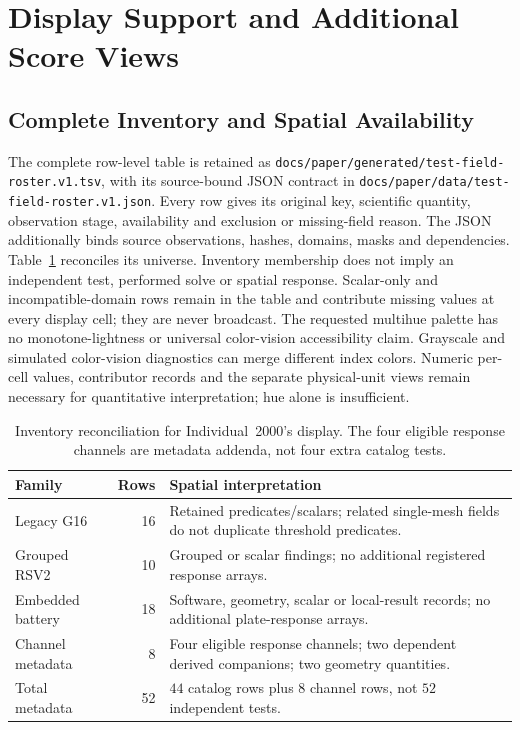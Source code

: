 \section{Display Support and Additional Score Views}
\label{sec:display-score-views}

\subsection{Complete Inventory and Spatial Availability}
The complete row-level table is retained as
\nolinkurl{docs/paper/generated/test-field-roster.v1.tsv}, with its source-bound
JSON contract in \nolinkurl{docs/paper/data/test-field-roster.v1.json}.
Every row gives its original key, scientific quantity, observation stage,
availability and exclusion or missing-field reason. The JSON additionally
binds source observations, hashes, domains, masks and dependencies.
Table~\ref{tab:display-roster-families} reconciles its universe. Inventory
membership does not imply an independent test, performed solve or spatial
response. Scalar-only and incompatible-domain rows remain in the table and
contribute missing values at every display cell; they are never broadcast.
The requested multihue palette has no monotone-lightness or universal
color-vision accessibility claim. Grayscale and simulated color-vision
diagnostics can merge different index colors. Numeric per-cell values,
contributor records and the separate physical-unit views remain necessary
for quantitative interpretation; hue alone is insufficient.

\begin{table}[ht]
\centering
\caption{Inventory reconciliation for Individual~2000's display. The four
eligible response channels are metadata addenda, not four extra catalog tests.}
\label{tab:display-roster-families}
\begin{tabular}{@{}lrp{}@{}}
\toprule
\textbf{Family} & \textbf{Rows} & \textbf{Spatial interpretation} \\
\midrule
Legacy G16 & 16 & Retained predicates/scalars; related single-mesh fields do not duplicate threshold predicates. \\
Grouped RSV2 & 10 & Grouped or scalar findings; no additional registered response arrays. \\
Embedded battery & 18 & Software, geometry, scalar or local-result records; no additional plate-response arrays. \\
Channel metadata & 8 & Four eligible response channels; two dependent derived companions; two geometry quantities. \\
\midrule
Total metadata & 52 & $44$ catalog rows plus $8$ channel rows, not $52$ independent tests. \\
\bottomrule
\end{tabular}
\end{table}

